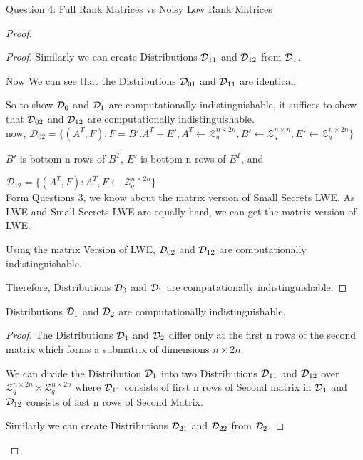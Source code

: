 \begin{solution}{Question 4: Full Rank Matrices vs Noisy Low Rank Matrices}
\begin{proof}
\begin{proof}
         Similarly we can create Distributions $\mathcal{D}_{11}$ and $\mathcal{D}_{12}$ from $\mathcal{D}_{1}$.

         Now We can see that the Distributions $\mathcal{D}_{01}$ and $\mathcal{D}_{11}$ are identical.

         So to show $\mathcal{D}_0$ and $\mathcal{D}_1$ are computationally indistinguishable, it suffices to show that $\mathcal{D}_{02}$ and $\mathcal{D}_{12}$ are computationally indistinguishable.\\

         now, $\mathcal{D}_{02} = \{ (A^T,F): F = B' . A^T + E', A^T \leftarrow \mathcal{Z}_q^{n\times 2n}, B' \leftarrow \mathcal{Z}_q^{n\times n}, E' \leftarrow \mathcal{Z}_q^{n\times 2n}\}$

         $B'$ is bottom n rows of $B^T$, $E'$ is bottom n rows of $E^T$, and 
         
         $\mathcal{D}_{12} = \{ (A^T,F):  A^T,F \leftarrow \mathcal{Z}_q^{n\times 2n} \}$\\

         Form Questions 3, we know about the matrix version of Small Secrets LWE. As LWE and Small Secrets LWE are equally hard, we can get the matrix version of LWE.

        Using the matrix Version of LWE, $\mathcal{D}_{02}$ and $\mathcal{D}_{12}$ are computationally indistinguishable.

        Therefore, Distributions $\mathcal{D}_0$ and $\mathcal{D}_1$ are computationally indistinguishable.
         
     \end{proof}
    
\begin{claim}
     Distributions $\mathcal{D}_1$ and $\mathcal{D}_2$ are computationally indistinguishable.
     \end{claim}

    \begin{proof}
        The Distributions $\mathcal{D}_1$ and $\mathcal{D}_2$ differ only at the first n rows of the second matrix which forms a submatrix of dimensions $n \times 2n$.

         We can divide the Distribution $\mathcal{D}_1$ into two Distributions $\mathcal{D}_{11}$ and $\mathcal{D}_{12}$ over $\mathcal{Z}_q^{n\times 2n} \times \mathcal{Z}_q^{n\times 2n}$ where $\mathcal{D}_{11}$ consists of first n rows of Second matrix in $\mathcal{D}_1$ and $\mathcal{D}_{12}$ consists of last n rows of Second Matrix.

         Similarly we can create Distributions $\mathcal{D}_{21}$ and $\mathcal{D}_{22}$ from $\mathcal{D}_{2}$.


\end{proof}
\end{proof}
\end{solution}
